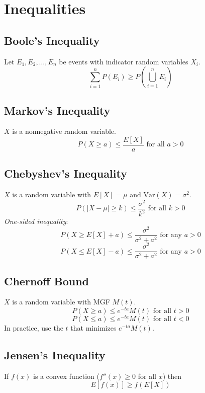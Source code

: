 \documentclass[12pt]{article}
\newcommand{\Var}{\text{Var}}
\begin{document}
\section{Inequalities}
\subsection{Boole's Inequality}
Let $E_1, E_2, \ldots, E_n$ be events with indicator random variables $X_i$.
\[
    \sum_{i=1}^n P(E_i) \geq P\left( \bigcup_{i=1}^n E_i \right)
\]
\subsection{Markov's Inequality}
$X$ is a nonnegative random variable.
\[
    P(X \geq a) \leq \frac{E[X]}{a} \text{ for all } a > 0
\]
\subsection{Chebyshev's Inequality}
$X$ is a random variable with $E[X] = \mu$ and $\Var(X) = \sigma^2$.
\[
    P(|X-\mu| \geq k) \leq \frac{\sigma^2}{k^2} \text{ for all } k > 0
\]
\emph{One-sided inequality}:
\[
    P(X \geq E[X] + a) \leq \frac{\sigma^2}{\sigma^2 + a^2} \text{ for any } a  > 0
\]
\[
    P(X \leq E[X] - a) \leq \frac{\sigma^2}{\sigma^2 + a^2} \text{ for any } a  > 0
\]
\subsection{Chernoff Bound}
$X$ is a random variable with MGF $M(t)$.
\[
    P(X \geq a) \leq e^{-ta} M(t) \text{ for all } t > 0 
\]
\[
    P(X \leq a) \leq e^{-ta} M(t) \text{ for all } t < 0 
\]
In practice, use the $t$ that minimizes $e^{-ta} M(t)$. 
 
\subsection{Jensen's Inequality}
If $f(x)$ is a convex function ($f''(x) \geq 0$ for all $x$) then
\[
    E[f(x)] \geq f(E[X])
\]
\end{document}
